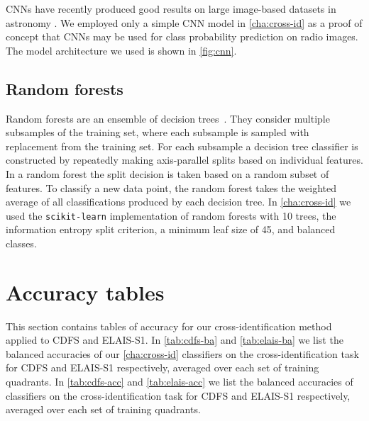     CNNs have recently produced good results on large image-based datasets in
    astronomy \citep[e.g.]{lukic18compact, dieleman15cnn}. We employed
    only a simple CNN model in \autoref{cha:cross-id} as a proof of concept that CNNs may
    be used for class probability prediction on radio images. The model
    architecture we used is shown in \autoref{fig:cnn}.

  \subsection{Random forests}
  \label{sec:atlas-random-forests}

    Random forests are an ensemble of decision
    trees~\citep{breiman01random-forest}. They consider multiple subsamples of
    the training set, where each subsample is sampled with replacement from
    the training set. For each subsample a decision tree classifier is
    constructed by repeatedly making axis-parallel splits based on individual
    features. In a random forest the split decision is taken based on a random
    subset of features. To classify a new data point, the random forest takes
    the weighted average of all classifications produced by each decision
    tree. {In \autoref{cha:cross-id} we used the \texttt{scikit-learn} \citep{pedregosa11sklearn}
    implementation of random forests with 10 trees, the information entropy
    split criterion, a minimum leaf size of 45, and balanced classes}.

\section{Accuracy tables}\label{sec:atlas-xid-accuracies}
  
  This section contains tables of accuracy for our cross-identification method applied to CDFS and
  ELAIS-S1. In \autoref{tab:cdfs-ba} and \autoref{tab:elais-ba} we list the
  balanced accuracies of our \autoref{cha:cross-id} classifiers on the cross-identification task for CDFS
  and ELAIS-S1 respectively, averaged over each set of training quadrants. In
  \autoref{tab:cdfs-acc} and \autoref{tab:elais-acc} we list the balanced
  accuracies of classifiers on the cross-identification task for CDFS and
  ELAIS-S1 respectively, averaged over each set of training quadrants.

